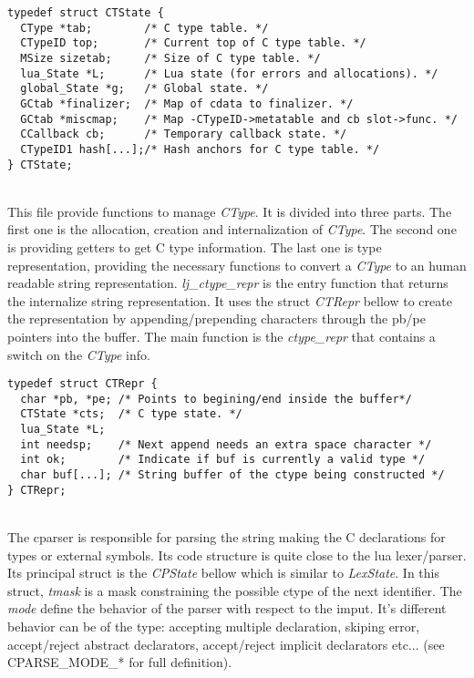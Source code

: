 \begin{adjustbox}{max width=\textwidth}
\begin{minipage}{\linewidth}
\begin{lstlisting}[style=CStyle]
typedef struct CTState {
  CType *tab;        /* C type table. */
  CTypeID top;       /* Current top of C type table. */
  MSize sizetab;     /* Size of C type table. */
  lua_State *L;      /* Lua state (for errors and allocations). */
  global_State *g;   /* Global state. */
  GCtab *finalizer;  /* Map of cdata to finalizer. */
  GCtab *miscmap;    /* Map -CTypeID->metatable and cb slot->func. */
  CCallback cb;      /* Temporary callback state. */
  CTypeID1 hash[...];/* Hash anchors for C type table. */
} CTState;
\end{lstlisting}
\end{minipage}
\end{adjustbox}

\\
This file provide functions to manage \emph{CType}. It is divided into three
parts. The first one is the allocation, creation and internalization of
\emph{CType}. The second one is providing getters to get C type information.
The last one is  type representation, providing the necessary functions to
convert a \emph{CType} to an human readable string representation.
\emph{lj\_ctype\_repr} is the entry function that returns the internalize string
representation. It uses the struct \emph{CTRepr} bellow to create the
representation by appending/prepending characters through the pb/pe pointers
into the buffer. The main function is the \emph{ctype\_repr} that contains a
switch on the \emph{CType} info.

\begin{lstlisting}[style=CStyle]
typedef struct CTRepr {
  char *pb, *pe; /* Points to begining/end inside the buffer*/
  CTState *cts;  /* C type state. */
  lua_State *L;
  int needsp;    /* Next append needs an extra space character */
  int ok;        /* Indicate if buf is currently a valid type */
  char buf[...]; /* String buffer of the ctype being constructed */
} CTRepr;
\end{lstlisting}

\\
The cparser is responsible for parsing the string making the C declarations
for types or external symbols. Its code structure is quite close to the
lua lexer/parser. Its principal struct is the \emph{CPState} bellow which is
similar to \emph{LexState}. In this struct, \emph{tmask} is a mask constraining
the possible ctype of the next identifier. The \emph{mode} define the behavior
of the parser with respect to the imput. It's different behavior can be of the
type: accepting multiple declaration, skiping error, accept/reject abstract
declarators, accept/reject implicit declarators etc... (see CPARSE\_MODE\_* for
full definition).

